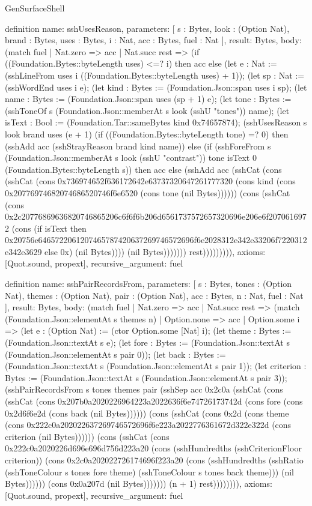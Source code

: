 \begin{lexlean}{GenSurfaceShell}
\begin{semanticmodule}
definition{
  name: sshUsesReason,
  parameters: [
    s : Bytes,
    look : (Option Nat),
    brand : Bytes,
    uses : Bytes,
    i : Nat,
    acc : Bytes,
    fuel : Nat
  ],
  result: Bytes,
  body: (match fuel
    | Nat.zero => acc
    | Nat.succ rest => (if ((Foundation.Bytes::byteLength uses) <=? i) then acc else (let e : Nat := (sshLineFrom uses i ((Foundation.Bytes::byteLength uses) + 1)); (let sp : Nat := (sshWordEnd uses i e); (let kind : Bytes := (Foundation.Json::span uses i sp); (let name : Bytes := (Foundation.Json::span uses (sp + 1) e); (let tone : Bytes := (sshToneOf s (Foundation.Json::memberAt s look (sshU "tones")) name); (let isText : Bool := (Foundation.Tar::sameBytes kind 0x74657874); (sshUsesReason s look brand uses (e + 1) (if ((Foundation.Bytes::byteLength tone) =? 0) then (sshAdd acc (sshStrayReason brand kind name)) else (if (sshForeFrom s (Foundation.Json::memberAt s look (sshU "contrast")) tone isText 0 (Foundation.Bytes::byteLength s)) then acc else (sshAdd acc (sshCat (cons (sshCat (cons 0x736974652f636172642e63737320647261777320 (cons kind (cons 0x20776974682074686520746f6e6520 (cons tone (nil Bytes)))))) (cons (sshCat (cons 0x2c20776869636820746865206c6f6f6b206d6561737572657320696e206e6f2070616972 (cons (if isText then 0x20756e6465722061207465787420637269746572696f6e2028312e342e33206f7220312e342e3629 else 0x) (nil Bytes)))) (nil Bytes))))))) rest))))))))),
  axioms: [Quot.sound, propext],
  recursive_argument: fuel
}

definition{
  name: sshPairRecordsFrom,
  parameters: [
    s : Bytes,
    tones : (Option Nat),
    themes : (Option Nat),
    pair : (Option Nat),
    acc : Bytes,
    n : Nat,
    fuel : Nat
  ],
  result: Bytes,
  body: (match fuel
    | Nat.zero => acc
    | Nat.succ rest => (match (Foundation.Json::elementAt s themes n)
      | Option.none => acc
      | Option.some i => (let e : (Option Nat) := (ctor Option.some [Nat] i); (let theme : Bytes := (Foundation.Json::textAt s e); (let fore : Bytes := (Foundation.Json::textAt s (Foundation.Json::elementAt s pair 0)); (let back : Bytes := (Foundation.Json::textAt s (Foundation.Json::elementAt s pair 1)); (let criterion : Bytes := (Foundation.Json::textAt s (Foundation.Json::elementAt s pair 3)); (sshPairRecordsFrom s tones themes pair (sshSep acc 0x2c0a (sshCat (cons (sshCat (cons 0x207b0a2020226964223a2022636f6e74726173742d (cons fore (cons 0x2d6f6e2d (cons back (nil Bytes)))))) (cons (sshCat (cons 0x2d (cons theme (cons 0x222c0a202022637269746572696f6e223a2022776361672d322e322d (cons criterion (nil Bytes)))))) (cons (sshCat (cons 0x222c0a2020226d696e696d756d223a20 (cons (sshHundredths (sshCriterionFloor criterion)) (cons 0x2c0a202022726174696f223a20 (cons (sshHundredths (sshRatio (sshToneColour s tones fore theme) (sshToneColour s tones back theme))) (nil Bytes)))))) (cons 0x0a207d (nil Bytes))))))) (n + 1) rest)))))))),
  axioms: [Quot.sound, propext],
  recursive_argument: fuel
}


\end{semanticmodule}
\end{lexlean}
